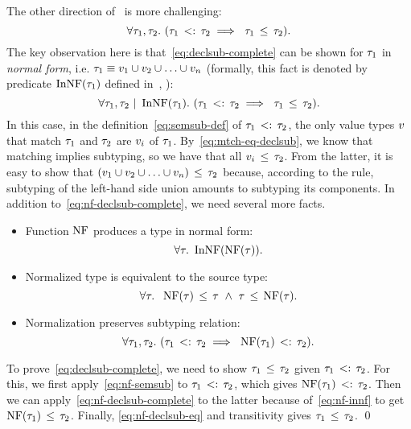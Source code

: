 The other direction of~ is more challenging: 
\begin{equation}\label{eq:declsub-complete}
\forall \ty_1, \ty_2.\ 
(\bjsemsub{\ty_1}{\ty_2} \implies\ \bjsub{\ty_1}{\ty_2}).
\end{equation}
The key observation here is that~\eqref{eq:declsub-complete} can be shown 
for $\tau_1$ in \emph{normal form},
i.e. $\tau_1 \equiv v_1 \cup v_2 \cup \ldots \cup v_n$
(formally, this fact is denoted by predicate $\mathop{\mathrm{InNF}}(\tau_1)$ 
defined in~, ):
\begin{equation}\label{eq:nf-declsub-complete}
\forall \tau_1, \tau_2 ~\vert~ \mathop{\mathrm{InNF}}(\tau_1).\
(\tau_1 \, <: \, \tau_2 \implies\ \tau_1 \, \leq \, \tau_2).
\end{equation}
In this case, in the definition~\eqref{eq:semsub-def}
of $\tau_1 \, <: \, \tau_2$, the only
value types $v$ that match $\tau_1$ and $\tau_2$ are $v_i$ of $\tau_1$. 
By~\eqref{eq:mtch-eq-declsub}, we know that matching implies subtyping,
so we have that all $v_i \, \leq \, \tau_2$.
From the latter, it is easy to show that 
$(v_1 \cup v_2 \cup \ldots \cup v_n) \, \leq \, \tau_2$ because,
according to the \RD{UnionL} rule,
subtyping of the left-hand side union amounts to subtyping its components.
In addition to~\eqref{eq:nf-declsub-complete}, we need several more facts.
\begin{itemize}
  \item Function $\mathop{\mathrm{NF}}$ produces a type in normal form:
	\begin{equation}\label{eq:nf-innf}
	\forall \tau.\ \mathop{\mathrm{InNF}}(\mathop{\mathrm{NF}}(\tau)).
	\end{equation}
  \item Normalized type is equivalent to the source type:
    \begin{equation}\label{eq:nf-declsub-eq}
    \forall \ty.\;\ \bjsub{\NF(\ty)}{\ty}\ \land\ \bjsub{\ty}{\NF(\ty)}.
    \end{equation}
  \item Normalization preserves subtyping relation:
    \begin{equation}\label{eq:nf-semsub}
    \forall \ty_1, \ty_2.\ 
    (\bjsemsub{\ty_1}{\ty_2} \implies\ \bjsemsub{\NF(\ty_1)}{\ty_2}).
    \end{equation}
\end{itemize}
To prove~\eqref{eq:declsub-complete}, we need to show $\tau_1 \, \leq \, \tau_2$
given $\tau_1 \, <: \, \tau_2$. 
For this, we first apply~\eqref{eq:nf-semsub} to $\tau_1 \, <: \, \tau_2$,
which gives $\mathop{\mathrm{NF}}(\tau_1) \, <: \, \tau_2$. 
Then we can apply~\eqref{eq:nf-declsub-complete} to the latter
because of~\eqref{eq:nf-innf} to get $\mathop{\mathrm{NF}}(\tau_1) \, \leq \, \tau_2$.
Finally, \eqref{eq:nf-declsub-eq} and transitivity 
gives $\tau_1 \, \leq \, \tau_2$. \qed

